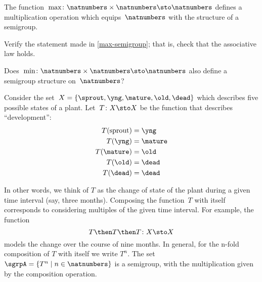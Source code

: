 \begin{example}
  \label{max-semigroup}
  The function~$\max \colon \natnumbers \times \natnumbers \sto \natnumbers$ defines a multiplication operation which equips~$\natnumbers$ with the structure of a semigroup.
\end{example}

\begin{exercise}
  \label{ex:max-semigroup}
  Verify the statement made in \cref{max-semigroup}; that is, check that the associative law holds.

  Does~$\min \colon \natnumbers \times \natnumbers \sto \natnumbers$ also define a semigroup structure on~$\natnumbers$?
\end{exercise}
\begin{solution}
\end{solution}


\begin{example}
  \label{plant-trafo-semigroup}
  Consider the set~$X = \{ \sprout, \yng, \mature, \old, \dead \}$ which describes five possible states of a plant. Let~$T \colon X \sto X$ be the function that describes ``development'':
  \begin{align*}
    T(\text{sprout}) &=  \yng \\
    T(\yng) &=  \mature \\
    T(\mature) &=  \old \\
    T( \old) &= \dead \\
    T (\dead) &= \dead
  \end{align*}

  In other words, we think of $T$ as the change of state of the plant during a given time interval (say, three months).
  Composing the function~$T$ with itself corresponds to considering multiples of the given time interval. For example, the function
  \begin{equation*}
    T \then T \then T \colon X \sto X
  \end{equation*}
  models the change over the course of nine months. In general, for the n-fold composition of $T$ with itself we write $T^n$.
  The set~$\sgrpA = \{ T^n \mid n \in \natnumbers \}$ is a semigroup, with the multiplication given by the composition operation.
\end{example}

